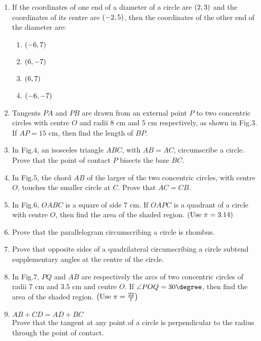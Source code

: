 \begin{enumerate}
\item If the coordinates of one end of a diameter of a circle are $\left(2,3\right)$ and the coordinates of its centre are $\left(-2,5\right)$, then the coordinates of the other end of the diameter are:\\
\begin{enumerate}
\item $\left(-6,7\right)$\\
\item $\left(6,-7\right)$\\
\item $\left(6,7\right)$\\
\item $\left(-6,-7\right)$\\
\end{enumerate}
\item Tangents $PA$ and $PB$ are drawn from an external point $P$ to two concentric circles with centre $O$ and radii $8 \text{ cm}$ and $5 \text{ cm}$ respectively, as shown in Fig.$3$. If $AP = 15\text{ cm}$, then find the length of $BP$.\\
\item In Fig.$4$, an isosceles triangle $ABC$, with $AB = AC$, circumscribe a circle. Prove that the point of contact $P$ bisects the base $BC$.\\
\item In Fig.$5$, the chord $AB$ of the larger of the two concentric circles, with centre $O$, touches the smaller circle at $C$. Prove that $AC = CB$.\\
\item In Fig.$6$, $OABC$ is a square of side $7 \text{ cm}$. If $OAPC$ is a quadrant of a circle with centre $O$, then find the area of the shaded region. $\left(\text{Use } \pi = 3.14\right)$\\ 
\item Prove that the parallelogram circumscribing a circle is rhombus.\\
\item Prove that opposite sides of a quadrilateral circumscribing a circle subtend supplementary angles at the centre of the circle.\\
\item In Fig.$7$, $PQ$ and $AB$ are respectively the arcs of two concentric circles of radii $7\text{ cm}$ and $3.5\text{ cm}$ and centre $O$. If $\angle POQ = 30\degree$, then find the area of the shaded region. $\left(\text{Use } \pi = \frac{22}{7}\right)$\\
\item $AB + CD = AD + BC$\\
Prove that the tangent at any point of a circle is perpendicular to the radius through the point of contact.\\


\end{enumerate}
